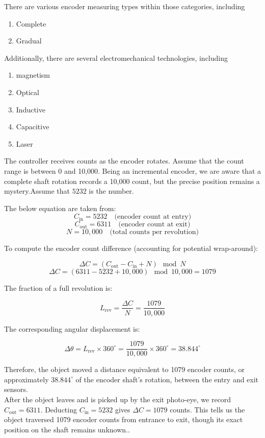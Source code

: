 \documentclass[12pt]{article}
\begin{document}
There are various encoder measuring types within those categories, including
\begin{enumerate}
    \item Complete
    \item Gradual
\end{enumerate}
Additionally, there are several electromechanical technologies, including
\begin{enumerate}
    \item magnetism
    \item Optical
    \item Inductive
    \item Capacitive
    \item Laser 
\end{enumerate}

The controller receives counts as the encoder rotates. Assume that the count range is between 0 and 10,000. Being an incremental encoder, we are aware that a complete shaft rotation records a 10,000 count, but the precise position remains a mystery.Assume that $5232$ is the number\cite{ref27}.

The below equation are taken from: \cite{ref27}
\[
C_{\text{in}} = 5232 \quad \text{(encoder count at entry)}
\]
\[
C_{\text{out}} = 6311 \quad \text{(encoder count at exit)}
\]
\[
N = 10{,}000 \quad \text{(total counts per revolution)} 
\]

To compute the encoder count difference (accounting for potential wrap-around):

\[
\Delta C = (C_{\text{out}} - C_{\text{in}} + N) \mod N 
\]
\[
\Delta C = (6311 - 5232 + 10{,}000) \mod 10{,}000 = 1079 
\]

The fraction of a full revolution is:

\[
L_{\text{rev}} = \frac{\Delta C}{N} = \frac{1079}{10{,}000} 
\]

The corresponding angular displacement is:

\[
\Delta \theta = L_{\text{rev}} \times 360^\circ = \frac{1079}{10{,}000} \times 360^\circ = 38.844^\circ 
\]

\noindent
Therefore, the object moved a distance equivalent to 1079 encoder counts, or approximately $38.844^\circ$ of the encoder shaft's rotation, between the entry and exit sensors\cite{ref27}.\\

After the object leaves and is picked up by the exit photo-eye, we record $C_{\mathrm{out}}=6311$.  Deducting $C_{\mathrm{in}}=5232$ gives $\Delta C=1079$ counts.  This tells us the object traversed 1079 encoder counts from entrance to exit, though its exact position on the shaft remains unknown.\cite{ref27}.
\end{document}
